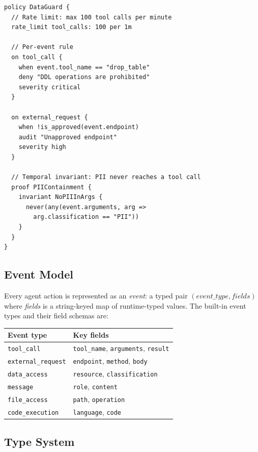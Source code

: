 \documentclass[sigconf]{acmart}
\begin{document}
\begin{lstlisting}[caption={A minimal Aegis policy.},label={lst:simple}]
policy DataGuard {
  // Rate limit: max 100 tool calls per minute
  rate_limit tool_calls: 100 per 1m

  // Per-event rule
  on tool_call {
    when event.tool_name == "drop_table"
    deny "DDL operations are prohibited"
    severity critical
  }

  on external_request {
    when !is_approved(event.endpoint)
    audit "Unapproved endpoint"
    severity high
  }

  // Temporal invariant: PII never reaches a tool call
  proof PIIContainment {
    invariant NoPIIInArgs {
      never(any(event.arguments, arg =>
        arg.classification == "PII"))
    }
  }
}
\end{lstlisting}

\subsection{Event Model}

Every agent action is represented as an \emph{event}: a typed pair
$(\textit{event\_type}, \textit{fields})$ where \textit{fields} is a string-keyed
map of runtime-typed values. The built-in event types and their field schemas are:

\begin{center}
\begin{tabular}{ll}
\toprule
Event type & Key fields \\
\midrule
\texttt{tool\_call} & \texttt{tool\_name}, \texttt{arguments}, \texttt{result} \\
\texttt{external\_request} & \texttt{endpoint}, \texttt{method}, \texttt{body} \\
\texttt{data\_access} & \texttt{resource}, \texttt{classification} \\
\texttt{message} & \texttt{role}, \texttt{content} \\
\texttt{file\_access} & \texttt{path}, \texttt{operation} \\
\texttt{code\_execution} & \texttt{language}, \texttt{code} \\
\bottomrule
\end{tabular}
\end{center}

\subsection{Type System}
\end{document}

